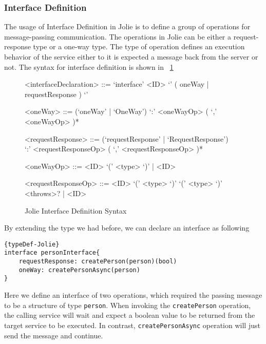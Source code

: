 \subsubsection{Interface Definition}
\label{sec:jolie-interface-def}

The usage of Interface Definition in Jolie is to define a group of operations for message-passing communication. The operations in Jolie can be either a request-response type or a one-way type. The type of operation defines an execution behavior of the service either to it is expected a message back from the server or not. The syntax for interface definition is shown in ~\ref{fig:InterfaceDefinitonSyntax}

\begin{figure}[h]
	\begin{framed}
		\begin{grammar}
			<interfaceDeclaration> ::= `interface' <ID> `{' ( oneWay | requestResponse ) `}'

			<oneWay> ::= (`oneWay' | `OneWay')  `:' <oneWayOp> ( `,' <oneWayOp> )*

			<requestResponse> ::= (`requestResponse' | `RequestResponse') \\ `:' <requestResponseOp> ( `,' <requestResponseOp> )*

			<oneWayOp> ::= <ID> `(' <type> `)' | <ID>

			<requestResponseOp> ::= <ID> `(' <type> `)' `(' <type> `)' <throws>? | <ID>

		\end{grammar}
	\end{framed}
	\caption{Jolie Interface Definition Syntax\protect\footnotemark}
	\label{fig:InterfaceDefinitonSyntax}
\end{figure}


By extending the type we had before, we can declare an interface as following
\begin{listing}[h]

\lstset{language=Jolie,
	style=codeStyle
}
\begin{lstlisting}[frame=tlrb, caption= {Jolie Interface declaration example} ]{typeDef-Jolie}
interface personInterface{
	requestResponse: createPerson(person)(bool)
	oneWay: createPersonAsync(person)
}
\end{lstlisting}
\end{listing}

Here we define an interface of two operations, which required the passing message to be a structure of type \texttt{person}. When invoking the \texttt{createPerson} operation, the calling service will wait and expect a boolean value to be returned from the target service to be executed. In contrast, \texttt{createPersonAsync} operation will just send the message and continue.

\FloatBarrier
